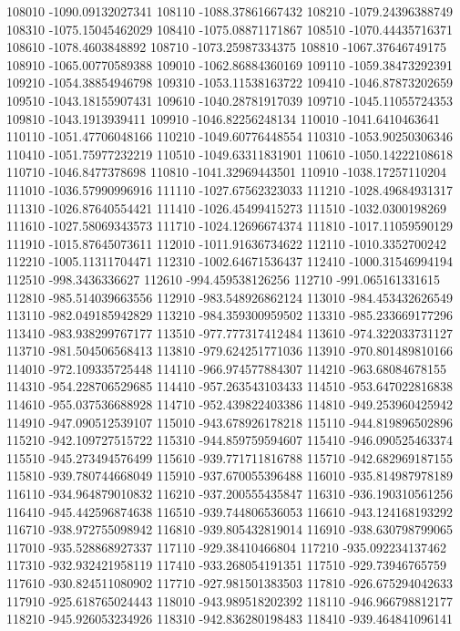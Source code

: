 {108010 -1090.09132027341
108110 -1088.37861667432
108210 -1079.24396388749
108310 -1075.15045462029
108410 -1075.08871171867
108510 -1070.44435716371
108610 -1078.4603848892
108710 -1073.25987334375
108810 -1067.37646749175
108910 -1065.00770589388
109010 -1062.86884360169
109110 -1059.38473292391
109210 -1054.38854946798
109310 -1053.11538163722
109410 -1046.87873202659
109510 -1043.18155907431
109610 -1040.28781917039
109710 -1045.11055724353
109810 -1043.1913939411
109910 -1046.82256248134
110010 -1041.6410463641
110110 -1051.47706048166
110210 -1049.60776448554
110310 -1053.90250306346
110410 -1051.75977232219
110510 -1049.63311831901
110610 -1050.14222108618
110710 -1046.8477378698
110810 -1041.32969443501
110910 -1038.17257110204
111010 -1036.57990996916
111110 -1027.67562323033
111210 -1028.49684931317
111310 -1026.87640554421
111410 -1026.45499415273
111510 -1032.0300198269
111610 -1027.58069343573
111710 -1024.12696674374
111810 -1017.11059590129
111910 -1015.87645073611
112010 -1011.91636734622
112110 -1010.3352700242
112210 -1005.11311704471
112310 -1002.64671536437
112410 -1000.31546994194
112510 -998.3436336627
112610 -994.459538126256
112710 -991.065161331615
112810 -985.514039663556
112910 -983.548926862124
113010 -984.453432626549
113110 -982.049185942829
113210 -984.359300959502
113310 -985.233669177296
113410 -983.938299767177
113510 -977.777317412484
113610 -974.322033731127
113710 -981.504506568413
113810 -979.624251771036
113910 -970.801489810166
114010 -972.109335725448
114110 -966.974577884307
114210 -963.68084678155
114310 -954.228706529685
114410 -957.263543103433
114510 -953.647022816838
114610 -955.037536688928
114710 -952.439822403386
114810 -949.253960425942
114910 -947.090512539107
115010 -943.678926178218
115110 -944.819896502896
115210 -942.109727515722
115310 -944.859759594607
115410 -946.090525463374
115510 -945.273494576499
115610 -939.771711816788
115710 -942.682969187155
115810 -939.780744668049
115910 -937.670055396488
116010 -935.814987978189
116110 -934.964879010832
116210 -937.200555435847
116310 -936.190310561256
116410 -945.442596874638
116510 -939.744806536053
116610 -943.124168193292
116710 -938.972755098942
116810 -939.805432819014
116910 -938.630798799065
117010 -935.528868927337
117110 -929.38410466804
117210 -935.092234137462
117310 -932.932421958119
117410 -933.268054191351
117510 -929.73946765759
117610 -930.824511080902
117710 -927.981501383503
117810 -926.675294042633
117910 -925.618765024443
118010 -943.989518202392
118110 -946.966798812177
118210 -945.926053234926
118310 -942.836280198483
118410 -939.464841096141
}
